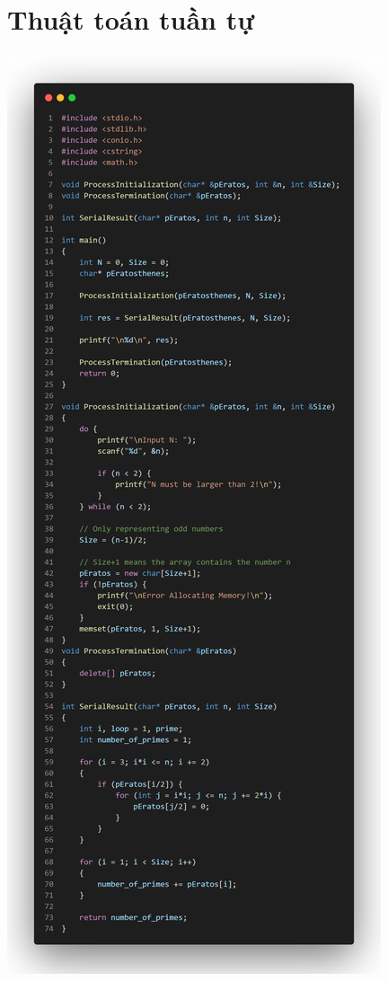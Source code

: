 \documentclass[12pt,a4paper]{report}
\begin{document}
\section{Thuật toán tuần tự}
\begin{center}
	\includegraphics[trim=0in 15in 0in 0in, clip, scale=0.2]{./Photos/Primes/Serial.PNG}

\end{center}
\end{document}
